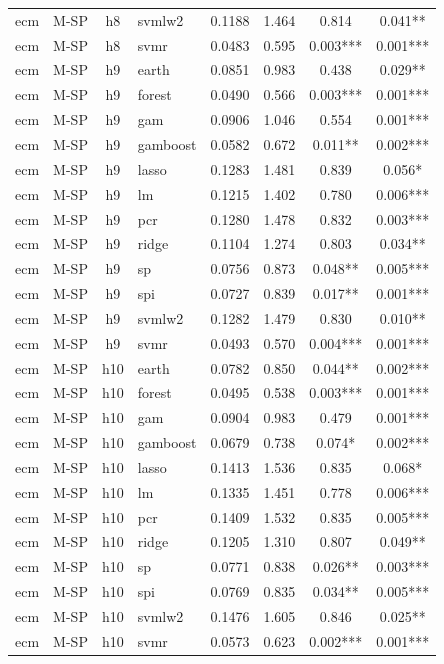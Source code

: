 \begin{ThreePartTable}
\begin{longtable}[t]{llclcccc}
ecm & M-SP & h8 & svmlw2 & 0.1188 & 1.464 & 0.814 & 0.041**\\
ecm & M-SP & h8 & svmr & 0.0483 & 0.595 & 0.003*** & 0.001***\\
\addlinespace
ecm & M-SP & h9 & earth & 0.0851 & 0.983 & 0.438 & 0.029**\\
ecm & M-SP & h9 & forest & 0.0490 & 0.566 & 0.003*** & 0.001***\\
ecm & M-SP & h9 & gam & 0.0906 & 1.046 & 0.554 & 0.001***\\
ecm & M-SP & h9 & gamboost & 0.0582 & 0.672 & 0.011** & 0.002***\\
ecm & M-SP & h9 & lasso & 0.1283 & 1.481 & 0.839 & 0.056*\\
ecm & M-SP & h9 & lm & 0.1215 & 1.402 & 0.780 & 0.006***\\
ecm & M-SP & h9 & pcr & 0.1280 & 1.478 & 0.832 & 0.003***\\
ecm & M-SP & h9 & ridge & 0.1104 & 1.274 & 0.803 & 0.034**\\
ecm & M-SP & h9 & sp & 0.0756 & 0.873 & 0.048** & 0.005***\\
ecm & M-SP & h9 & spi & 0.0727 & 0.839 & 0.017** & 0.001***\\
ecm & M-SP & h9 & svmlw2 & 0.1282 & 1.479 & 0.830 & 0.010**\\
ecm & M-SP & h9 & svmr & 0.0493 & 0.570 & 0.004*** & 0.001***\\
\addlinespace
ecm & M-SP & h10 & earth & 0.0782 & 0.850 & 0.044** & 0.002***\\
ecm & M-SP & h10 & forest & 0.0495 & 0.538 & 0.003*** & 0.001***\\
ecm & M-SP & h10 & gam & 0.0904 & 0.983 & 0.479 & 0.001***\\
ecm & M-SP & h10 & gamboost & 0.0679 & 0.738 & 0.074* & 0.002***\\
ecm & M-SP & h10 & lasso & 0.1413 & 1.536 & 0.835 & 0.068*\\
ecm & M-SP & h10 & lm & 0.1335 & 1.451 & 0.778 & 0.006***\\
ecm & M-SP & h10 & pcr & 0.1409 & 1.532 & 0.835 & 0.005***\\
ecm & M-SP & h10 & ridge & 0.1205 & 1.310 & 0.807 & 0.049**\\
ecm & M-SP & h10 & sp & 0.0771 & 0.838 & 0.026** & 0.003***\\
ecm & M-SP & h10 & spi & 0.0769 & 0.835 & 0.034** & 0.005***\\
ecm & M-SP & h10 & svmlw2 & 0.1476 & 1.605 & 0.846 & 0.025**\\
ecm & M-SP & h10 & svmr & 0.0573 & 0.623 & 0.002*** & 0.001***\\

\end{longtable}
\end{ThreePartTable}
